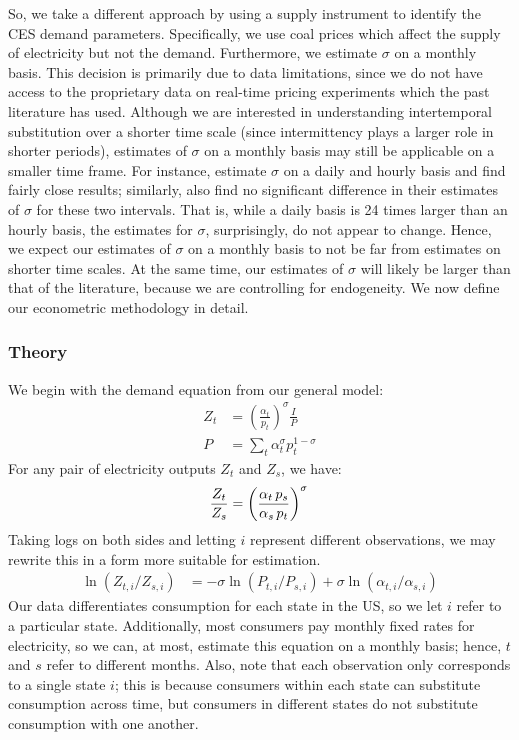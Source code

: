 \documentclass[11pt,a4paper,leqno]{extarticle}
\begin{document}
	So, we take a different approach by using a supply instrument to identify the CES demand parameters. Specifically, we use coal prices which affect the supply of electricity but not the demand. Furthermore, we estimate $\sigma$ on a monthly basis. This decision is primarily due to data limitations, since we do  not have access to the proprietary data on real-time pricing experiments which the past literature has used. Although we are interested in understanding intertemporal substitution over a shorter time scale (since intermittency plays a larger role in shorter periods), estimates of $\sigma$ on a monthly basis may still be applicable on a smaller time frame. For instance, \citet{Schwarz} estimate $\sigma$ on a daily and hourly basis and find fairly close results; similarly, \citet{Herriges} also find no significant difference in their estimates of $\sigma$ for these two intervals. That is, while a daily basis is 24 times larger than an hourly basis, the estimates for $\sigma$, surprisingly, do not appear to change. Hence, we expect our estimates of $\sigma$ on a monthly basis to not be far from estimates on shorter time scales. At the same time, our estimates of $\sigma$ will likely be larger than that of the literature, because we are controlling for endogeneity. We now define our econometric methodology in detail.
	
	\subsubsection{Theory}
	
	
	We begin with the demand equation from our general model:
	\begin{align}
	Z_t &= \left(\frac{\alpha_t}{p_t} \right)^\sigma \frac{I}{P} \\
	P &= \sum_t \alpha_t^\sigma p_t^{1-\sigma}
	\end{align}
	For any pair of electricity outputs $Z_t$ and $Z_s$, we have:
	$$\frac{Z_t}{Z_s} = \left(\frac{\alpha_t \, p_s}{\alpha_s \, p_t} \right)^\sigma \\$$
	Taking logs on both sides and letting $i$ represent different observations, we may rewrite this in a form more suitable for estimation. 
	\begin{align}
	\ln (Z_{t, i} / Z_{ s, i}) &= -\sigma \ln (P_{t,i} / P_{s,i}) + \sigma \ln (\alpha_{t,i} / \alpha_{s,i}) 
	\end{align}
	Our data differentiates consumption for each state in the US, so we let $i$ refer to a particular state. Additionally, most consumers pay monthly fixed rates for electricity, so we can, at most, estimate this equation on a monthly basis; hence, $t$ and $s$ refer to different months. Also, note that each observation only corresponds to a single state $i$; this is because consumers within each state can substitute consumption across time, but consumers in different states do not substitute consumption with one another. 
	
\end{document}

